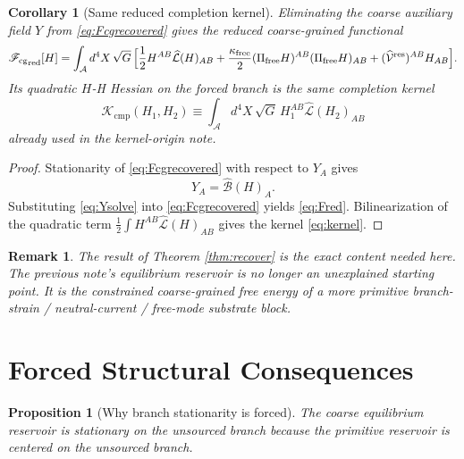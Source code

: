 \documentclass[11pt]{article}
\newcommand{\Sub}{\mathcal A}
\newcommand{\ResidualLift}{\widehat{\mathcal V}^{\mathrm{res}}}
\newcommand{\SubGaugeVec}{\widehat{\mathcal B}}
\newcommand{\SubReducedEin}{\widehat{\mathcal L}}
\newcommand{\FreeProj}{\Pi_{\mathrm{free}}}
\newcommand{\GaugeAux}{Y}
\newcommand{\CompKernel}{\mathscr K_{\mathrm{cmp}}}
\newcommand{\CoarseFunctional}{\mathscr F_{\mathrm{cg}}}
\newcommand{\FreeStiff}{\kappa_{\mathrm{free}}}
\newtheorem{proposition}{Proposition}
\newtheorem{remark}{Remark}
\newtheorem{corollary}{Corollary}
\begin{document}
\begin{corollary}[Same reduced completion kernel]
\label{cor:kernel}
Eliminating the coarse auxiliary field \(\GaugeAux\) from \eqref{eq:Fcgrecovered} gives the reduced coarse-grained functional
\begin{equation}
{\CoarseFunctional}_{\mathrm{red}}[H]
=
\int_{\Sub} d^4X\,\sqrt{G}\,
\Bigl[
\frac12 H^{AB}\SubReducedEin(H)_{AB}
+\frac{\FreeStiff}{2}(\FreeProj H)^{AB}(\FreeProj H)_{AB}
+(\ResidualLift)^{AB}H_{AB}
\Bigr].
\label{eq:Fred}
\end{equation}
Its quadratic \(H\)-H Hessian on the forced branch is the same completion kernel
\begin{equation}
\CompKernel(H_1,H_2)
\equiv
\int_{\Sub} d^4X\,\sqrt{G}\,
H_1^{AB}\SubReducedEin(H_2)_{AB}
\label{eq:kernel}
\end{equation}
already used in the kernel-origin note.
\end{corollary}

\begin{proof}
Stationarity of \eqref{eq:Fcgrecovered} with respect to \(\GaugeAux_A\) gives
\begin{equation}
\GaugeAux_A=\SubGaugeVec(H)_A.
\label{eq:Ysolve}
\end{equation}
Substituting \eqref{eq:Ysolve} into \eqref{eq:Fcgrecovered} yields \eqref{eq:Fred}. Bilinearization of the quadratic term \(\frac12\int H^{AB}\SubReducedEin(H)_{AB}\) gives the kernel \eqref{eq:kernel}.
\end{proof}

\begin{remark}
The result of Theorem \ref{thm:recover} is the exact content needed here. The previous note's equilibrium reservoir is no longer an unexplained starting point. It is the constrained coarse-grained free energy of a more primitive branch-strain / neutral-current / free-mode substrate block.
\end{remark}

\section{Forced Structural Consequences}

\begin{proposition}[Why branch stationarity is forced]
\label{prop:forcedstationary}
The coarse equilibrium reservoir is stationary on the unsourced branch because the primitive reservoir is centered on the unsourced branch.
\end{proposition}
\end{document}

